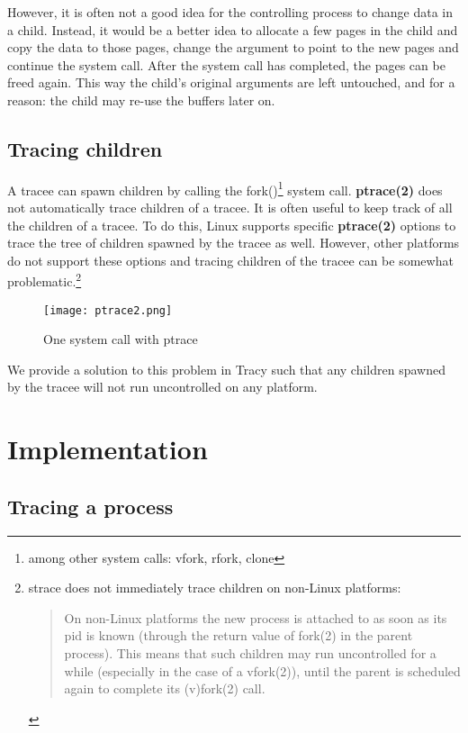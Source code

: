 \documentclass[a4paper, twoside, 10pt, twocolumn]{report}
\begin{document}
However, it is often not a good idea for the controlling process to change data
in a child. Instead, it would be a better idea to allocate a few pages in the
child and copy the data to those pages, change the argument to point to the new
pages and continue the system call. After the system call has completed, the
pages can be freed again. This way the child's original arguments are left
untouched, and for a reason: the child may re-use the buffers later on.

\section{Tracing children}

A tracee can spawn children by calling the fork()\footnote{among other system
calls: vfork, rfork, clone} system call. \textbf{ptrace(2)} does not
automatically trace children of a tracee. It is often useful to keep track of
all the children of a tracee. To do this, Linux supports specific
\textbf{ptrace(2)} options to trace the tree of children spawned by the tracee
as well. However, other platforms do not support these options and tracing
children of the tracee can be somewhat problematic.\footnote{strace does not
immediately trace children on non-Linux platforms:
\begin{quote}
    On non-Linux platforms the new process is attached to as soon as its pid is
    known (through the return value of fork(2) in the parent process).
    This means that such children may run uncontrolled for a while
    (especially in the case of a vfork(2)), until the parent is scheduled
    again to complete its (v)fork(2)  call.
\end{quote}
}

\begin{figure}
\label{fig2}
\texttt{[image: ptrace2.png]}
\caption{One system call with ptrace}
\end{figure}

We provide a solution to this problem in Tracy such that any children spawned
by the tracee will not run uncontrolled on any platform.

\chapter{Implementation}

\section{Tracing a process}
\end{document}
